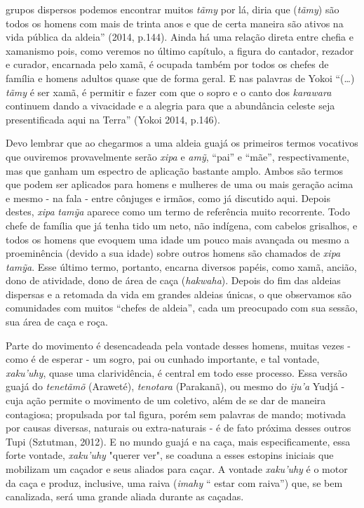 grupos dispersos podemos encontrar muitos \emph{tãmy} por lá, diria que
(\emph{tãmy}) são todos os homens com mais de trinta anos e que de certa
maneira são ativos na vida pública da aldeia'' (2014, p.144). Ainda há
uma relação direta entre chefia e xamanismo pois, como veremos no último
capítulo, a figura do cantador, rezador e curador, encarnada pelo xamã,
é ocupada também por todos os chefes de família e homens adultos quase
que de forma geral. E nas palavras de Yokoi ``(\ldots{}) \emph{tãmy} é ser
xamã, é permitir e fazer com que o sopro e o canto dos \emph{karawara}
continuem dando a vivacidade e a alegria para que a abundância celeste
seja presentificada aqui na Terra'' (Yokoi 2014, p.146).

Devo lembrar que ao chegarmos a uma aldeia guajá os primeiros termos
vocativos que ouviremos provavelmente serão \emph{xipa} e \emph{amỹ},
``pai'' e ``mãe'', respectivamente, mas que ganham um espectro de
aplicação bastante amplo. Ambos são termos que podem ser aplicados para
homens e mulheres de uma ou mais geração acima e mesmo - na fala - entre
cônjuges e irmãos, como já discutido aqui. Depois destes, \emph{xipa}
\emph{tamỹa} aparece como um termo de referência muito recorrente. Todo
chefe de família que já tenha tido um neto, não indígena, com cabelos
grisalhos, e todos os homens que evoquem uma idade um pouco mais
avançada ou mesmo a proeminência (devido a sua idade) sobre outros
homens são chamados de \emph{xipa} \emph{tamỹa}. Esse último termo,
portanto, encarna diversos papéis, como xamã, ancião, dono de atividade,
dono de área de caça (\emph{hakwaha}). Depois do fim das aldeias
dispersas e a retomada da vida em grandes aldeias únicas, o que
observamos são comunidades com muitos ``chefes de aldeia'', cada um
preocupado com sua sessão, sua área de caça e roça.

Parte do movimento é desencadeada pela vontade desses homens, muitas
vezes - como é de esperar - um sogro, pai ou cunhado importante, e tal
vontade, \emph{xaku'uhy}, quase uma clarividência, é central em todo
esse processo. Essa versão guajá do \emph{tenetãmõ} (Araweté),
\emph{tenotara} (Parakanã), ou mesmo do \emph{iju'a} Yudjá - cuja ação
permite o movimento de um coletivo, além de se dar de maneira
contagiosa; propulsada por tal figura, porém sem palavras de mando;
motivada por causas diversas, naturais ou extra-naturais - é de fato
próxima desses outros Tupi (Sztutman, 2012). E no mundo guajá e na caça,
mais especificamente, essa forte vontade, \emph{xaku'uhy} "querer ver",
se coaduna a esses estopins iniciais que mobilizam um caçador e seus
aliados para caçar. A vontade \emph{xaku'uhy} é o motor da caça e
produz, inclusive, uma raiva (\emph{imahy} `` estar com raiva'') que, se
bem canalizada, será uma grande aliada durante as caçadas.

